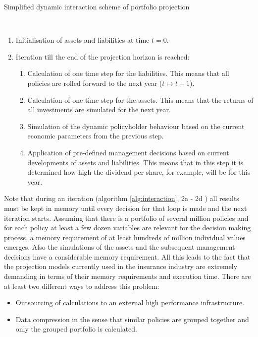 \begin{algorithm}
	\caption{Simplified dynamic interaction scheme of portfolio projection}\label{alg:interaction}
	\begin{algorithmic}
		\\
		\begin{enumerate}
			\item Initialisation of assets and liabilities at time $t = 0$.
			\item  Iteration till the end of the projection horizon is reached:
			\begin{enumerate}[label=\emph{\alph*})]
				\item Calculation of one time step for the liabilities. This means that all policies are rolled forward to the next year ($t \mapsto t+1$). 
				\item Calculation of one time step for the assets. This means that the returns of all investments are simulated for the next year.
				\item Simulation of the dynamic policyholder behaviour based on the current economic parameters from the previous step.
				\item Application of pre-defined management decisions based on current developments of assets and liabilities. This means that in this step it is determined how high the dividend per share, for example, will be for this year. 
			\end{enumerate}
		\end{enumerate}
	\end{algorithmic}
\end{algorithm}

Note that during an iteration (algorithm \ref{alg:interaction}, 2a - 2d ) all results must be kept in memory until every decision for that loop is made and the next iteration starts. Assuming that there is a portfolio of several million policies and for each policy at least a few dozen variables are relevant for the decision making process, a memory requirement of at least hundreds of million individual values emerges. Also the simulations of the assets and the subsequent management decisions have a considerable memory requirement. All this leads to the fact that the projection models currently used in the insurance industry are extremely demanding in terms of their memory requirements and execution time. There are at least two different ways to address this problem:

\begin{itemize}
	\item Outsourcing of calculations to an external high performance infrastructure.
	\item Data compression in the sense that similar policies are grouped together and only the grouped portfolio is calculated.
\end{itemize}

